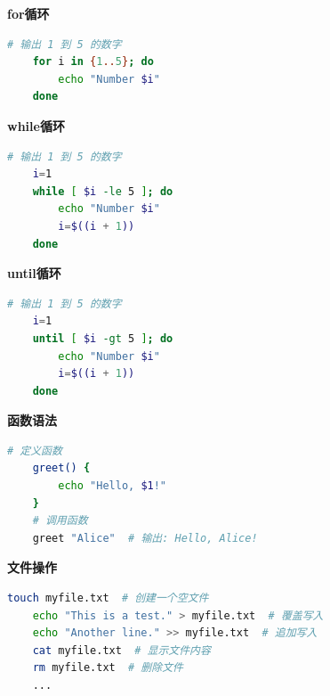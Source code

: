 \textbf{for循环}
\begin{lstlisting}[language=sh,caption={for-循环语法},label=code:shell_base4]
	# 输出 1 到 5 的数字
	for i in {1..5}; do
		echo "Number $i"
	done
\end{lstlisting}


\textbf{while循环}
\begin{lstlisting}[language=sh,caption={while-循环语法},label=code:shell_base5]
	# 输出 1 到 5 的数字
	i=1
	while [ $i -le 5 ]; do
		echo "Number $i"
		i=$((i + 1))
	done
\end{lstlisting}


\textbf{until循环}
\begin{lstlisting}[language=sh,caption={until-循环语法},label=code:shell_base6]
	# 输出 1 到 5 的数字
	i=1
	until [ $i -gt 5 ]; do
		echo "Number $i"
		i=$((i + 1))
	done
\end{lstlisting}


\textbf{函数语法}
\begin{lstlisting}[language=sh,caption={函数},label=code:shell_base7]
	# 定义函数
	greet() {
		echo "Hello, $1!"
	}
	# 调用函数
	greet "Alice"  # 输出: Hello, Alice!
\end{lstlisting}


\textbf{文件操作}
\begin{lstlisting}[language=sh,caption={文件操作},label=code:shell_base8]
	touch myfile.txt  # 创建一个空文件
	echo "This is a test." > myfile.txt  # 覆盖写入
	echo "Another line." >> myfile.txt  # 追加写入
	cat myfile.txt  # 显示文件内容
	rm myfile.txt  # 删除文件
	...
\end{lstlisting}

